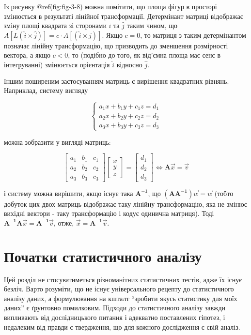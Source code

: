 \documentclass[
  11pt,
]{book}
\begin{document}
Із рисунку @ref(fig:fig-3-8) можна помітити, що площа фігур в просторі
змінюється в результаті лінійної трансформації. Детермінант матриці
відображає зміну площі квадрата зі сторонами \(\hat{i}\) та \(\hat{j}\)
таким чином, що
\(A[L(\hat{i} \times \hat{j})] = c \cdot A[(\hat{i} \times \hat{j})]\).
Якщо \(c = 0\), то матриця з таким детермінантом позначає лінійну
трансформацію, що призводить до зменшення розмірності вектора, а якщо
\(c<0\), то (подібно до того, як від'ємна площа має сенс в інтегруванні)
змінюється орієнтація \(\hat{i}\) відносно \(\hat{j}\).

Іншим поширеним застосуванням матриць є вирішення квадратних рівнянь.
Наприклад, систему вигляду

\[\begin{cases}
a_1 x + b_1 y + c_1 z = d_1 \\
a_2 x + b_2 y + c_2 z = d_2 \\
a_3 x + b_3 y + c_3 z = d_3
\end{cases}\]

можна зобразити у вигляді матриць:

\[\begin{bmatrix}
a_1 & b_1 & c_1 \\
a_2 & b_2 & c_2 \\
a_3 & b_3 & c_3
\end{bmatrix}
\begin{bmatrix}
x \\
y \\
z
\end{bmatrix} = 
\begin{bmatrix}
d_1 \\
d_2 \\
d_3
\end{bmatrix} \iff \mathbf{A} \vec{x} = \vec{v}\]

і систему можна вирішити, якщо існує така \(\mathbf{A^{-1}}\), що
\((\mathbf{AA^{-1}}) \vec{w} = \vec{w}\) (тобто добуток цих двох матриць
відображає таку лінійну трансформацію, яка не змінює вихідні вектори -
таку трансформацію і кодує одинична матриця). Тоді
\(\mathbf{A^{-1} A} \vec{x} = \mathbf{A^{-1}} \vec{v}\), отже,
\(\vec{x} = \mathbf{A^{-1}} \vec{v}\).

\section{Початки статистичного аналізу}\label{stats}

Цей розділ не стосуватиметься різноманітних статистичних тестів, адже їх
існує безліч. Варто розуміти, що не існує універсального рецепту до
статистичного аналізу даних, а формулювання на кшталт ``зробити якусь
статистику для моїх даних'' є ґрунтовно помилковим. Підходи до
статистичного аналізу завжди випливають від дослідницького питання і
адекватно поставлених гіпотез, і недалеким від правди є твердження, що
для кожного дослідження є свій аналіз.
\end{document}
